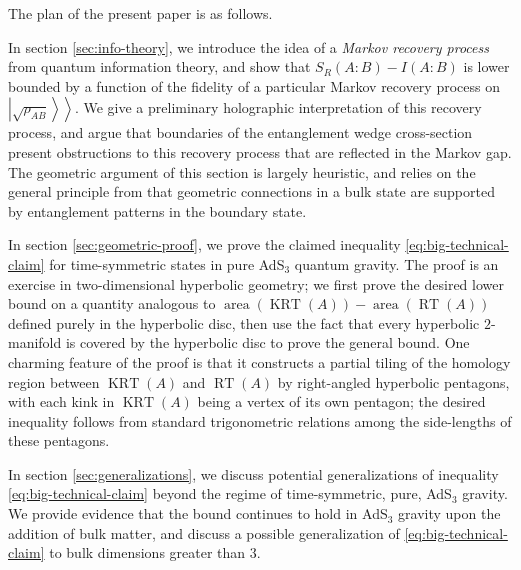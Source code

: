 \documentclass[a4paper,11pt]{article}
\newcommand{\area}{\operatorname{area}}
\newcommand{\RT}{\operatorname{RT}}
\newcommand{\KRT}{\operatorname{KRT}}
\newcommand{\kett}[1]{\left.\left| #1 \right\rangle \right\rangle}
\begin{document}
The plan of the present paper is as follows.

In section \ref{sec:info-theory}, we introduce the idea of a \emph{Markov recovery process} from quantum information theory, and show that $S_R(A:B) - I(A:B)$ is lower bounded by a function of the fidelity of a particular Markov recovery process on $\kett{\sqrt{\rho_{AB}}}$. We give a preliminary holographic interpretation of this recovery process, and argue that boundaries of the entanglement wedge cross-section present obstructions to this recovery process that are reflected in the Markov gap. The geometric argument of this section is largely heuristic, and relies on the general principle from \cite{van2010building} that geometric connections in a bulk state are supported by entanglement patterns in the boundary state.

In section \ref{sec:geometric-proof}, we prove the claimed inequality \eqref{eq:big-technical-claim} for time-symmetric states in pure AdS$_3$ quantum gravity. The proof is an exercise in two-dimensional hyperbolic geometry; we first prove the desired lower bound on a quantity analogous to $\area(\KRT(A)) - \area(\RT(A))$ defined purely in the hyperbolic disc, then use the fact that every hyperbolic $2$-manifold is covered by the hyperbolic disc to prove the general bound. One charming feature of the proof is that it constructs a partial tiling of the homology region between $\KRT(A)$ and $\RT(A)$ by right-angled hyperbolic pentagons, with each kink in $\KRT(A)$ being a vertex of its own pentagon; the desired inequality follows from standard trigonometric relations among the side-lengths of these pentagons.

In section \ref{sec:generalizations}, we discuss potential generalizations of inequality \eqref{eq:big-technical-claim} beyond the regime of time-symmetric, pure, AdS$_3$ gravity. We provide evidence that the bound continues to hold in AdS$_3$ gravity upon the addition of bulk matter, and discuss a possible generalization of \eqref{eq:big-technical-claim} to bulk dimensions greater than $3$.
\end{document}
